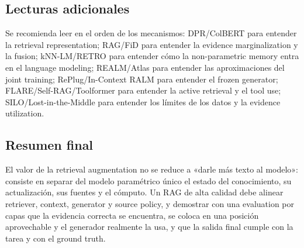 \documentclass[a4paper]{article}
\begin{document}
\subsection{Lecturas adicionales}

Se recomienda leer en el orden de los mecanismos: DPR/ColBERT para entender la retrieval representation; RAG/FiD para entender la evidence marginalization y la fusion; kNN-LM/RETRO para entender cómo la non-parametric memory entra en el language modeling; REALM/Atlas para entender las aproximaciones del joint training; RePlug/In-Context RALM para entender el frozen generator; FLARE/Self-RAG/Toolformer para entender la active retrieval y el tool use; SILO/Lost-in-the-Middle para entender los límites de los datos y la evidence utilization.

\subsection{Resumen final}

El valor de la retrieval augmentation no se reduce a «darle más texto al modelo»: consiste en separar del modelo paramétrico único el estado del conocimiento, su actualización, sus fuentes y el cómputo. Un RAG de alta calidad debe alinear retriever, context, generator y source policy, y demostrar con una evaluation por capas que la evidencia correcta se encuentra, se coloca en una posición aprovechable y el generador realmente la usa, y que la salida final cumple con la tarea y con el ground truth.
\end{document}
